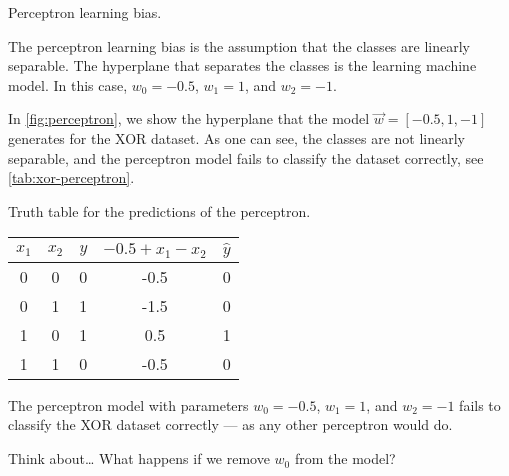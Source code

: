 \begin{figurebox}[label=fig:perceptron]{Perceptron learning bias.}
  \centering
  \tcblower
  The perceptron learning bias is the assumption that the classes are linearly separable.
  The hyperplane that separates the classes is the learning machine model.
  In this case, $w_0 = -0.5$, $w_1 = 1$, and $w_2 = -1$.
\end{figurebox}

In \cref{fig:perceptron}, we show the hyperplane that the model $\vec{w} = [-0.5, 1, -1]$
generates for the XOR dataset.  As one can see, the classes are not linearly separable,
and the perceptron model fails to classify the dataset correctly, see \cref{tab:xor-perceptron}.

\begin{tablebox}[label=tab:xor-perceptron]{Truth table for the predictions of the perceptron.}
  \centering
  \begin{tabular}{ccc|cc}
    \toprule
    $x_1$ & $x_2$ & $y$ & $-0.5 + x_1 - x_2$ & $\hat{y}$ \\
    \midrule
    0 & 0 & 0 & -0.5 & 0 \\
    0 & 1 & 1 & -1.5 & 0 \\
    1 & 0 & 1 & 0.5 & 1 \\
    1 & 1 & 0 & -0.5 & 0 \\
    \bottomrule
  \end{tabular}
  \tcblower
  The perceptron model with parameters $w_0 = -0.5$, $w_1 = 1$, and $w_2 = -1$
  fails to classify the XOR dataset correctly --- as any other perceptron would do.
\end{tablebox}

\begin{hlbox}{Think about\dots}
  What happens if we remove $w_0$ from the model?
\end{hlbox}

